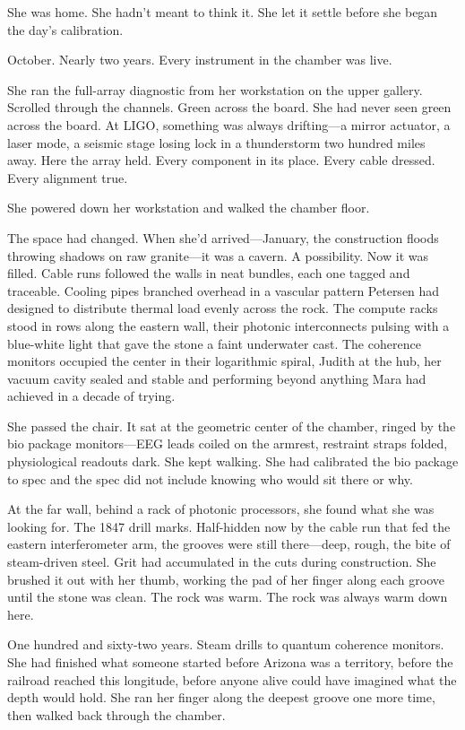 She was home. She hadn't meant to think it. She let it settle before she began the day's calibration.

\scenebreak

October. Nearly two years. Every instrument in the chamber was live.

She ran the full-array diagnostic from her workstation on the upper gallery. Scrolled through the channels. Green across the board. She had never seen green across the board. At LIGO, something was always drifting---a mirror actuator, a laser mode, a seismic stage losing lock in a thunderstorm two hundred miles away. Here the array held. Every component in its place. Every cable dressed. Every alignment true.

She powered down her workstation and walked the chamber floor.

The space had changed. When she'd arrived---January, the construction floods throwing shadows on raw granite---it was a cavern. A possibility. Now it was filled. Cable runs followed the walls in neat bundles, each one tagged and traceable. Cooling pipes branched overhead in a vascular pattern Petersen had designed to distribute thermal load evenly across the rock. The compute racks stood in rows along the eastern wall, their photonic interconnects pulsing with a blue-white light that gave the stone a faint underwater cast. The coherence monitors occupied the center in their logarithmic spiral, Judith at the hub, her vacuum cavity sealed and stable and performing beyond anything Mara had achieved in a decade of trying.

She passed the chair. It sat at the geometric center of the chamber, ringed by the bio package monitors---EEG leads coiled on the armrest, restraint straps folded, physiological readouts dark. She kept walking. She had calibrated the bio package to spec and the spec did not include knowing who would sit there or why.

At the far wall, behind a rack of photonic processors, she found what she was looking for. The 1847 drill marks. Half-hidden now by the cable run that fed the eastern interferometer arm, the grooves were still there---deep, rough, the bite of steam-driven steel. Grit had accumulated in the cuts during construction. She brushed it out with her thumb, working the pad of her finger along each groove until the stone was clean. The rock was warm. The rock was always warm down here.

One hundred and sixty-two years. Steam drills to quantum coherence monitors. She had finished what someone started before Arizona was a territory, before the railroad reached this longitude, before anyone alive could have imagined what the depth would hold. She ran her finger along the deepest groove one more time, then walked back through the chamber.

